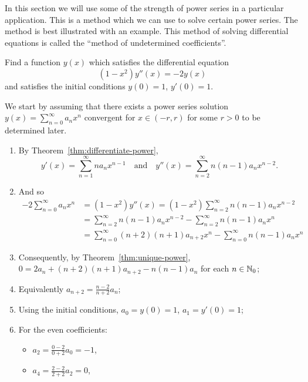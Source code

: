 In this section we will use some of the strength of power series in a particular application. This is a method which we can use to solve certain power series. The method is best illustrated with an example.
This method of solving differential equations is called the ``method of undetermined coefficients''.

\begin{task}
  Find a function \(y(x)\) which satisfies the differential equation
  \[
    (1-x^2)y''(x) = -2y(x)
  \]
  and satisfies the initial conditions \(y(0)=1\), \(y'(0)=1\).
\end{task}

\begin{solution}

  We start by assuming that there exists a power series solution \(y(x) = \sum_{n=0}^{\infty}a_n x^n\) convergent for \(x \in (-r,r)\) for some \(r>0\) to be determined later.
  \begin{enumerate}
    \item
          By Theorem~\ref{thm:differentiate-power},
          \[
            y'(x) = \sum_{n=1}^{\infty}n a_n x^{n-1}
            \quad\text{and} \quad
            y''(x) = \sum_{n=2}^{\infty}n(n-1) a_n x^{n-2}.
          \]
    \item And so
          \[
            \begin{aligned}
              -2 \sum_{n=0}^{\infty}a_n x^n
               & = (1-x^2)y''(x)
              = (1-x^2) \sum_{n=2}^{\infty}n(n-1) a_n x^{n-2}                                        \\
               & = \sum_{n=2}^{\infty}n(n-1) a_n x^{n-2} - \sum_{n=2}^{\infty}n(n-1) a_n x^{n}       \\
               & = \sum_{n=0}^{\infty}(n+2)(n+1) a_{n+2} x^{n} - \sum_{n=0}^{\infty}n(n-1) a_n x^{n}
            \end{aligned}
          \]
    \item Consequently, by Theorem~\ref{thm:unique-power}, \(0 = 2a_n +  (n+2)(n+1) a_{n+2} -  n(n-1) a_n \) for each \(n \in \mathbb{N}_0\);
    \item Equivalently \(a_{n+2} = \frac{n-2}{n+2}a_n\);
    \item Using the initial conditions,  \(a_0 = y(0) = 1\), \(a_1 = y'(0) = 1\);
    \item For the even coefficients:
          \begin{itemize}
            \item \(a_2 =  \frac{0-2}{0+2}a_0 = -1\),
            \item \(a_4 =  \frac{2-2}{2+2}a_2 = 0\),

\end{itemize}
\end{enumerate}
\end{solution}
